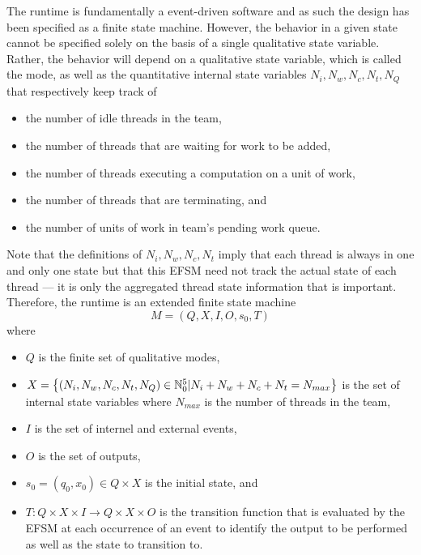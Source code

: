 \documentclass{article}
\newcommand{\N}                 {{\mathbb N}}
\begin{document}
The runtime is fundamentally a event-driven software and as such the design has
been specified as a finite state machine.  However, the behavior in a given
state cannot be specified solely on the basis of a single qualitative state
variable.  Rather, the behavior will depend on a qualitative state variable,
which is called the mode, as well as the quantitative internal state variables
$N_i, N_w, N_c, N_t, N_Q$ that respectively keep track of 
\begin{itemize}
\item{the number of idle threads in the team,}
\item{the number of threads that are waiting for work to be added,}
\item{the number of threads executing a computation on a unit of work,}
\item{the number of threads that are terminating, and}
\item{the number of units of work in team's pending work queue.}
\end{itemize}
Note that the definitions of $N_i, N_w, N_c, N_t$ imply that each thread is
always in one and only one state but that this EFSM need not track the actual
state of each thread --- it is only the aggregated thread state information that
is important.  Therefore, the runtime is an extended finite state machine 
\[
M = (Q, X, I, O, s_0, T)
\]
where
\begin{itemize}
\item{$Q$ is the finite set of qualitative modes,}
\item{$X = \set{(N_i, N_w, N_c, N_t, N_Q) \in \N_0^5 | N_i + N_w + N_c + N_t =
N_{max}}$ is the set of internal state variables where $N_{max}$ is the
number of threads in the team,}
\item{$I$ is the set of internel and external events,}
\item{$O$ is the set of outputs,}
\item{$s_0 = (q_0, x_0) \in Q \times X$ is the initial state, and}
\item{$T : Q \times X \times I \to Q \times X \times O$ is the transition
function that is evaluated by the EFSM at each occurrence of an event to
identify the output to be performed as well as the state to transition to.}
\end{itemize}
\end{document}
